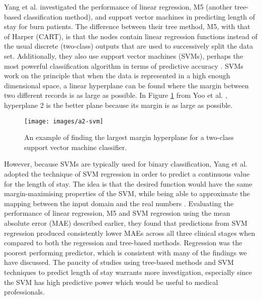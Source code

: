 Yang et al. investigated the performance of linear regression, M5 (another
tree-based classification method), and support vector machines in predicting
length of stay for burn patients. The difference between their tree method,
M5, with that of Harper (CART), is that the nodes contain linear regression
functions instead of the usual discrete (two-class) outputs that are used to
successively split the data set. Additionally, they also use support vector
machines (SVMs), perhaps the most powerful classification algorithm in terms of
predictive accuracy \citep{Bellazzi2008}. SVMs work on the principle that when
the data is represented in a high enough dimensional space, a linear hyperplane
can be found where the margin between two different records is as large as
possible. In Figure \ref{fig:svm-example} from Yoo et al. \citep{Yoo2012},
hyperplane 2 is the better plane because its margin is as large as possible. 
\begin{figure}[h]
\centering
\texttt{[image: images/a2-svm]}
\caption{An example of finding the largest margin hyperplane for a two-class
support vector machine classifier.}
\label{fig:svm-example}
\end{figure}

However, because SVMs are typically
used for binary classification, Yang et al. adopted the technique of SVM
regression in order to predict a continuous value for the length of stay. The
idea is that the desired function would have the same margin-maximising
properties of the SVM, while being able to approximate the mapping between the
input domain and the real numbers \citep{Yang2010}. Evaluating the performance
of linear regression, M5 and SVM regression using the mean absolute error
(MAE) described earlier, they found that predictions from SVM regression
produced consistently lower MAEs across all three clinical stages when compared
to both the regression and tree-based methods. Regression was the poorest
performing predictor, which is consistent with many of the findings we have
discussed. The paucity of studies using tree-based methods and SVM techniques
to predict length of stay warrants more investigation, especially since the
SVM has high predictive power which would be useful to medical professionals.


